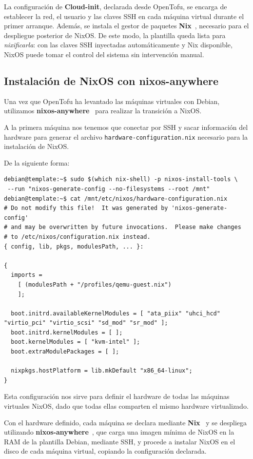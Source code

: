 \documentclass[a4paper, 11pt]{article}
\begin{document}
La configuración de \textbf{Cloud-init}, declarada desde OpenTofu, se encarga de establecer 
la red, el usuario y las claves SSH en cada máquina virtual durante el primer arranque. 
Además, se instala el gestor de paquetes \textbf{Nix}~\cite{nix}, necesario para el 
despliegue posterior de NixOS. De este modo, la plantilla queda lista para 
\textit{nixificarla}: con las claves SSH inyectadas automáticamente y Nix disponible, 
NixOS puede tomar el control del sistema sin intervención manual.

\subsection{Instalación de NixOS con nixos-anywhere}

Una vez que OpenTofu ha levantado las máquinas virtuales con Debian, utilizamos 
\textbf{nixos-anywhere}~\cite{nixos-anywhere} para realizar la transición a NixOS. 

A la primera máquina nos tenemos que conectar por SSH y sacar información del 
hardware para generar el archivo \texttt{hardware-configuration.nix} necesario 
para la instalación de NixOS.

De la siguiente forma:

\begin{lstlisting}[style=bash]
debian@template:~$ sudo $(which nix-shell) -p nixos-install-tools \
 --run "nixos-generate-config --no-filesystems --root /mnt"
debian@template:~$ cat /mnt/etc/nixos/hardware-configuration.nix
# Do not modify this file!  It was generated by 'nixos-generate-config'
# and may be overwritten by future invocations.  Please make changes
# to /etc/nixos/configuration.nix instead.
{ config, lib, pkgs, modulesPath, ... }:

{
  imports =
    [ (modulesPath + "/profiles/qemu-guest.nix")
    ];

  boot.initrd.availableKernelModules = [ "ata_piix" "uhci_hcd" "virtio_pci" "virtio_scsi" "sd_mod" "sr_mod" ];
  boot.initrd.kernelModules = [ ];
  boot.kernelModules = [ "kvm-intel" ];
  boot.extraModulePackages = [ ];

  nixpkgs.hostPlatform = lib.mkDefault "x86_64-linux";
}
\end{lstlisting}

Esta configuración nos sirve para definir el hardware de todas las máquinas virtuales 
NixOS, dado que todas ellas comparten el mismo hardware virtualizado.

Con el hardware definido, cada máquina se declara mediante \textbf{Nix}~\cite{nix} y se 
despliega utilizando \textbf{nixos-anywhere}~\cite{nixos-anywhere}, que carga una imagen 
mínima de NixOS en la RAM de la plantilla Debian, mediante SSH, y procede a instalar 
NixOS en el disco de cada máquina virtual, copiando la configuración declarada.
\end{document}
